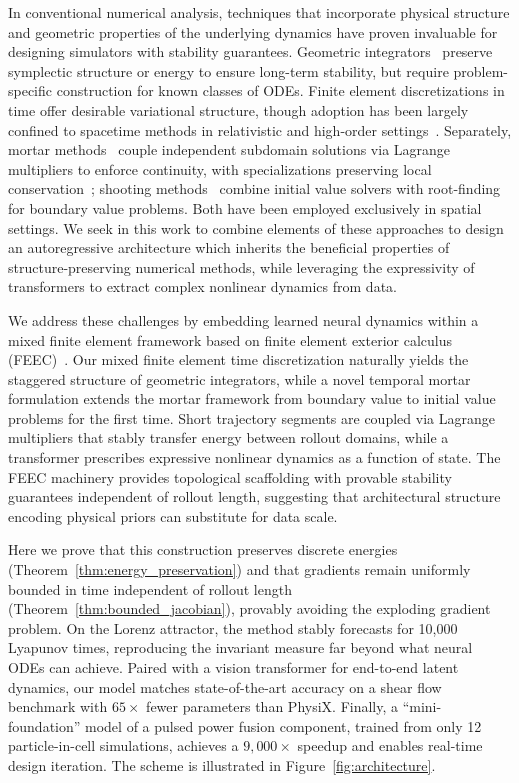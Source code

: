 \documentclass[12pt]{article}
\begin{document}
In conventional numerical analysis, techniques that incorporate physical structure and geometric properties of the underlying dynamics have proven invaluable for designing simulators with stability guarantees. Geometric integrators~\cite{hairer2006geometric} preserve symplectic structure or energy to ensure long-term stability, but require problem-specific construction for known classes of ODEs. Finite element discretizations in time offer desirable variational structure, though adoption has been largely confined to spacetime methods in relativistic and high-order settings~\cite{hulbert1990space,rhebergen2013space,langer2021unstructured,frontin2021foundations}. Separately, mortar methods~\cite{bernardi1993domain} couple independent subdomain solutions via Lagrange multipliers to enforce continuity, with specializations preserving local conservation~\cite{arbogast2007multiscale,quarteroni1999domain,cockburn2009unified,jiang2024structure}; shooting methods~\cite{ascher1995numerical} combine initial value solvers with root-finding for boundary value problems. Both have been employed exclusively in spatial settings. We seek in this work to combine elements of these approaches to design an autoregressive architecture which inherits the beneficial properties of structure-preserving numerical methods, while leveraging the expressivity of transformers to extract complex nonlinear dynamics from data.

We address these challenges by embedding learned neural dynamics within a mixed finite element framework based on finite element exterior calculus (FEEC)~\cite{arnold2018finite}. Our mixed finite element time discretization naturally yields the staggered structure of geometric integrators, while a novel temporal mortar formulation extends the mortar framework from boundary value to initial value problems for the first time. Short trajectory segments are coupled via Lagrange multipliers that stably transfer energy between rollout domains, while a transformer prescribes expressive nonlinear dynamics as a function of state. The FEEC machinery provides topological scaffolding with provable stability guarantees independent of rollout length, suggesting that architectural structure encoding physical priors can substitute for data scale.

Here we prove that this construction preserves discrete energies (Theorem~\ref{thm:energy_preservation}) and that gradients remain uniformly bounded in time independent of rollout length (Theorem~\ref{thm:bounded_jacobian}), provably avoiding the exploding gradient problem. On the Lorenz attractor, the method stably forecasts for 10,000 Lyapunov times, reproducing the invariant measure far beyond what neural ODEs can achieve. Paired with a vision transformer for end-to-end latent dynamics, our model matches state-of-the-art accuracy on a shear flow benchmark with $65\times$ fewer parameters than PhysiX. Finally, a ``mini-foundation'' model of a pulsed power fusion component, trained from only 12 particle-in-cell simulations, achieves a $9{,}000\times$ speedup and enables real-time design iteration. The scheme is illustrated in Figure~\ref{fig:architecture}.
\end{document}
